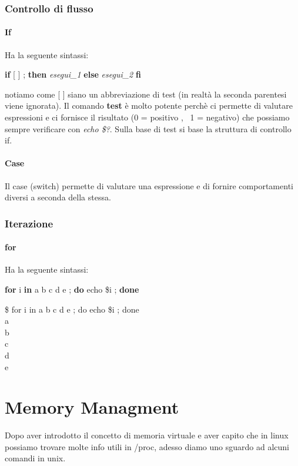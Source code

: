 \documentclass[a4paper,12pt]{article} %
\begin{document}
\subsubsection{Controllo di flusso}
\paragraph{If} 
Ha la seguente sintassi:\\
\begin{center}
\textbf{if} [ ] ; \textbf{then} \textit{esegui\_1} \textbf{else} \textit{esegui\_2} \textbf{fi}
\end{center}
notiamo come [ ] siano un abbreviazione di test (in realtà la seconda parentesi viene ignorata). Il comando \textbf{test} è molto potente perchè ci permette di valutare espressioni e 
ci fornisce il risultato (0 = positivo ,~ 1 = negativo) che possiamo sempre verificare con \textit{echo \$?}. Sulla base di test si base la struttura di controllo if.
\paragraph{Case}
Il case (switch) permette di valutare una espressione e di fornire comportamenti diversi a seconda della stessa.

\subsubsection{Iterazione}
\paragraph{for}
Ha la seguente sintassi:\\
\begin{center}
\textbf{for} i \textbf{in} a b c d e ; \textbf{do} echo \$i ; \textbf{done}
\end{center}
\$ for i in a b c d e ; do echo \$i ; done\\
a\\
b\\
c\\
d\\
e\\
\section{Memory Managment}
Dopo aver introdotto il concetto di memoria virtuale e aver capito che in linux possiamo trovare molte info utili in /proc, adesso diamo uno sguardo ad alcuni comandi in unix.
\end{document}
